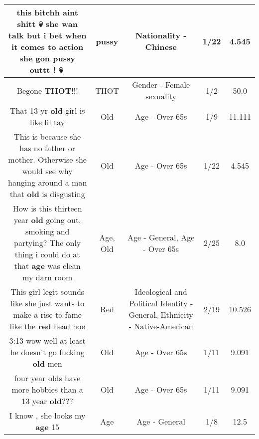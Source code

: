 \documentclass[11pt]{article}
\newlength\mylength
\begin{document}
\begin{center}
\begin{longtable}{|C{.65\mylength}|C{.30\mylength}|C{.12\mylength}|C{.12\mylength}|C{.12\mylength}|}
  \small this bitchh aint shitt 💀 she wan talk but i bet when it comes to action she gon \textbf{pussy} outtt ! 💀🤣\normalsize   & pussy & Nationality - Chinese & 1/22 & 4.545 \\  \hline
  \small Begone \textbf{THOT}!!!\normalsize   & THOT & Gender - Female sexuality & 1/2 & 50.0 \\  \hline
  \small That 13 yr \textbf{old} girl is like lil tay\normalsize   & Old & Age - Over 65s & 1/9 & 11.111 \\  \hline
  \small This is because she has no father or mother. Otherwise she would see why hanging around a man that \textbf{old} is disgusting\normalsize   & Old & Age - Over 65s & 1/22 & 4.545 \\  \hline
  \small How is this thirteen year \textbf{old} going out, smoking and partying? The only thing i could do at that \textbf{age} was clean my darn room\normalsize   & Age, Old & Age - General, Age - Over 65s & 2/25 & 8.0 \\  \hline
  \small This girl legit sounds like she just wants to make a rise to fame like the \textbf{r\textbf{ed}} head hoe\normalsize   & Red &  Ideological and Political Identity - General, Ethnicity - Native-American & 2/19 & 10.526 \\  \hline
  \small 3:13 wow well at least he doesn't go fucking \textbf{old} men\normalsize   & Old & Age - Over 65s & 1/11 & 9.091 \\  \hline
  \small four year olds have more hobbies than a 13 year \textbf{old}???\normalsize   & Old & Age - Over 65s & 1/11 & 9.091 \\  \hline
  \small I know , she looks my \textbf{age} 15\normalsize   & Age & Age - General & 1/8 & 12.5 \\  \hline

\end{longtable}
\end{center}
\end{document}
